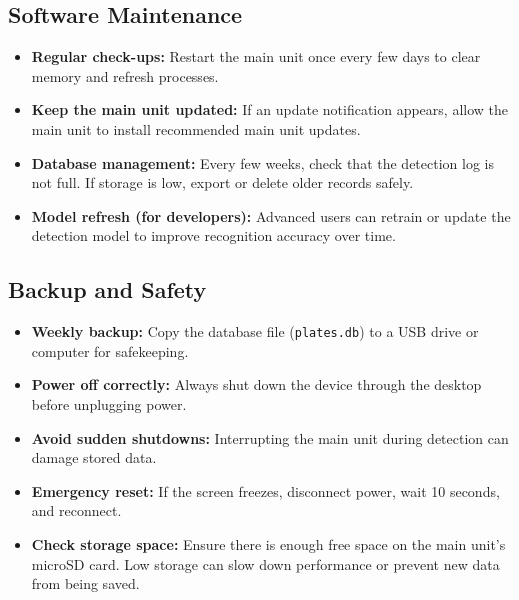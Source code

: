 \subsection{Software Maintenance}

\begin{itemize}
	\item \textbf{Regular check-ups:}  
	Restart the main unit  once every few days to clear memory and refresh processes.
	
	\item \textbf{Keep the main unit updated:}  
	If an update notification appears, allow the main unit to install recommended main unit updates.
	
	\item \textbf{Database management:}  
	Every few weeks, check that the detection log is not full.  
	If storage is low, export or delete older records safely.
	
	\item \textbf{Model refresh (for developers):}  
	Advanced users can retrain or update the detection model to improve recognition accuracy over time.
\end{itemize}



\subsection{Backup and Safety}

\begin{itemize}
	\item \textbf{Weekly backup:}  
	Copy the database file (\texttt{plates.db}) to a USB drive or computer for safekeeping.
	
	\item \textbf{Power off correctly:}  
	Always shut down the device through the desktop before unplugging power.
	
	\item \textbf{Avoid sudden shutdowns:}  
	Interrupting the main unit during detection can damage stored data.
	
	\item \textbf{Emergency reset:}  
	If the screen freezes, disconnect power, wait 10 seconds, and reconnect.
	\item \textbf{Check storage space:}  
	Ensure there is enough free space on the main unit's microSD card.  
	Low storage can slow down performance or prevent new data from being saved.
\end{itemize}

